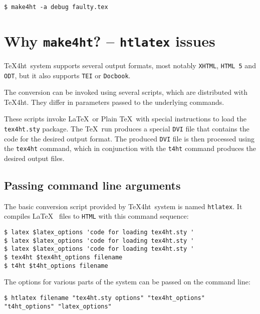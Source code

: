 \begin{verbatim}
$ make4ht -a debug faulty.tex
\end{verbatim}

\hypertarget{why-make4ht-htlatex-issues}{%
\section{\texorpdfstring{Why \texttt{make4ht}? -- \texttt{htlatex}
issues}{Why make4ht? -- htlatex issues}}\label{why-make4ht-htlatex-issues}}

\TeX4ht~system supports several output formats, most notably
\texttt{XHTML}, \texttt{HTML\ 5} and \texttt{ODT}, but it also supports
\texttt{TEI} or \texttt{Docbook}.

The conversion can be invoked using several scripts, which are
distributed with \TeX4ht. They differ in parameters passed to the
underlying commands.

These scripts invoke \LaTeX~or Plain \TeX~with special instructions to
load the \texttt{tex4ht.sty} package. The \TeX~run produces a special
\texttt{DVI} file that contains the code for the desired output format.
The produced \texttt{DVI} file is then processed using the
\texttt{tex4ht} command, which in conjunction with the \texttt{t4ht}
command produces the desired output files.

\hypertarget{passing-command-line-arguments}{%
\subsection{Passing command line
arguments}\label{passing-command-line-arguments}}

The basic conversion script provided by \TeX4ht~system is named
\texttt{htlatex}. It compiles \LaTeX~ files to \texttt{HTML} with this
command sequence:

\begin{verbatim}
$ latex $latex_options 'code for loading tex4ht.sty '
$ latex $latex_options 'code for loading tex4ht.sty '
$ latex $latex_options 'code for loading tex4ht.sty '
$ tex4ht $tex4ht_options filename
$ t4ht $t4ht_options filename
\end{verbatim}

The options for various parts of the system can be passed on the command
line:

\begin{verbatim}
$ htlatex filename "tex4ht.sty options" "tex4ht_options" "t4ht_options" "latex_options"
\end{verbatim}

